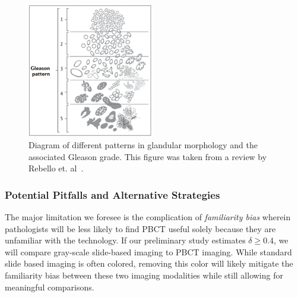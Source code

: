 \documentclass{NIHGrant}
\theoremstyle{theorem}
\begin{document}
\begin{figure}
  \vspace{-0.2cm} \includegraphics[width=0.49\textwidth]{ ./figures/ggrade1.png }
  \caption{Diagram of different patterns in glandular morphology and the associated Gleason grade. This figure was taken from a review by Rebello et. al~\cite{rebello_prostate_2021}.}\label{fig:setup}
\end{figure}

\subsubsection*{Potential Pitfalls and Alternative Strategies}
The major limitation we foresee is the complication of \textit{familiarity bias} wherein pathologists will be less likely to find PBCT useful solely because they are unfamiliar with the technology. If our preliminary study estimates \(\delta\geq 0.4\), we will compare gray-scale slide-based imaging to PBCT imaging. While standard slide based imaging is often colored, removing this color will likely mitigate the familiarity bias between these two imaging modalities while still allowing for meaningful comparisons.
\end{document}
